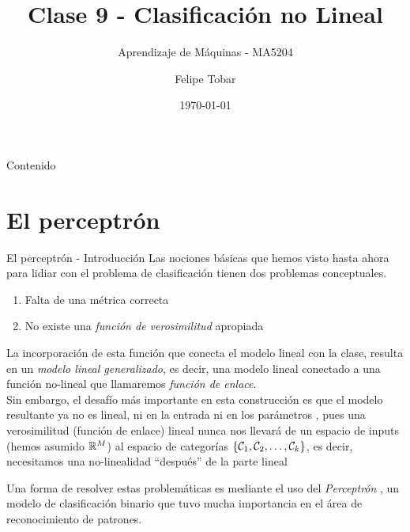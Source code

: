 \documentclass[9pt]{beamer}
\title{Clase 9 - Clasificación no Lineal}
\subtitle{Aprendizaje de Máquinas - MA5204}
\date{\today}
\author{Felipe Tobar}
\institute{Department of Mathematical Engineering \&\\ Center for Mathematical Modelling\\Universidad de Chile}
\begin{document}
\begin{frame}
  \titlepage
\end{frame}
\begin{frame}{Contenido}
  \tableofcontents
  
\end{frame}

\section{El perceptrón}

\begin{frame}{El perceptrón - Introducción}
Las nociones básicas que hemos visto hasta ahora para lidiar con el problema de clasificación tienen dos problemas conceptuales. \pause
\begin{enumerate}
  \item Falta de una métrica correcta \pause
  \item No existe una \emph{función de verosimilitud} apropiada \pause
\end{enumerate}
La incorporación de esta función que conecta el modelo lineal con la clase, resulta en un \emph{modelo lineal generalizado}, es decir, una modelo lineal conectado a una  función no-lineal que llamaremos \emph{función de enlace}.\\ \pause
Sin embargo, el desafío más importante en esta construcción es que el modelo resultante ya no es lineal, ni en la entrada ni en los parámetros , pues una verosimilitud (función de enlace) lineal nunca nos llevará de un espacio de inputs (hemos asumido $\mathbb{R}^M$) al espacio de categorías $\{{\mathcal C}_1,{\mathcal C}_2,\ldots,{\mathcal C}_k\}$, es decir, necesitamos una no-linealidad ``después'' de la parte lineal \\ \pause

Una forma de resolver estas problemáticas es mediante el uso del \emph{Perceptrón} \cite{rosenblatt_1958}, un modelo de clasificación binario que tuvo mucha importancia en el área de reconocimiento de patrones.

\end{frame}
\end{document}
